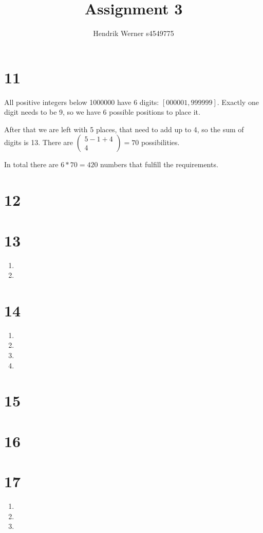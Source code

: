 \documentclass[12pt]{article}
\title{Assignment 3}
\author{
	Hendrik Werner s4549775
}
\begin{document}
\maketitle

\section*{11}
All positive integers below 1000000 have 6 digits: $[000001, 999999]$. Exactly one digit needs to be 9, so we have 6 possible positions to place it.

After that we are left with 5 places, that need to add up to 4, so the sum of digits is 13. There are $\begin{pmatrix}
	5 - 1 + 4 \\ 4
\end{pmatrix} = 70$ possibilities.

In total there are $6 * 70 = 420$ numbers that fulfill the requirements.

\section*{12}

\section*{13}
\begin{enumerate}[a]
	\item %
	\item %
\end{enumerate}

\section*{14}
\begin{enumerate}[a]
	\item %
	\item %
	\item %
	\item %
\end{enumerate}

\section*{15}

\section*{16}

\section*{17}
\begin{enumerate}[a]
	\item %
	\item %
	\item %
\end{enumerate}
\end{document}
